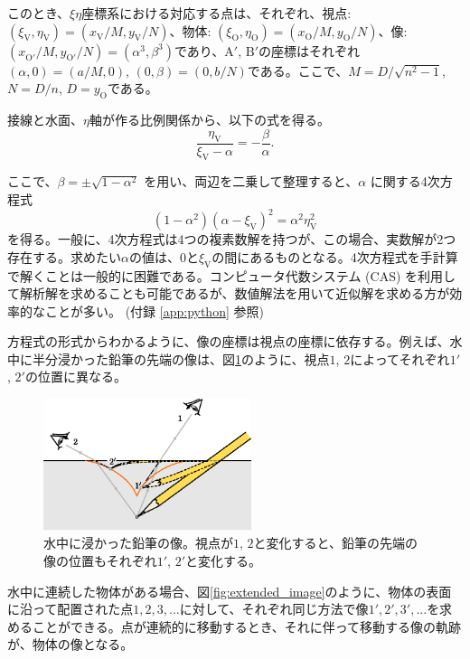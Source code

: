 \documentclass[twocolumn]{article}
\begin{document}
このとき、$\xi\eta$座標系における対応する点は、それぞれ、視点: $(\xi_{\mathrm{V}}^{}, \eta_{\mathrm{V}}^{})=(x_{\mathrm{V}}^{}/M, y_{\mathrm{V}}^{}/N)$、物体: $(\xi_{\mathrm{O}}^{}, \eta_{\mathrm{O}}^{})=(x_{\mathrm{O}}^{}/M, y_{\mathrm{O}}^{}/N)$、像: $(x_{\mathrm{O'}}^{}/M, y_{\mathrm{O'}}^{}/N)=(\alpha^3, \beta^3)$であり、$\mathrm{A'}$, $\mathrm{B'}$の座標はそれぞれ$(\alpha, 0) = (a/M, 0)$, $(0, \beta) = (0, b/N)$である。ここで、$M=D/\sqrt{n^2-1}$, $N=D/n$, $D=y_{\mathrm{O}}^{}$である。

接線と水面、$\eta$軸が作る比例関係から、以下の式を得る。
$$\dfrac{\eta_{\mathrm{V}}^{}}{\xi_{\mathrm{V}}^{}-\alpha}=-\dfrac{\beta}{\alpha}.$$

ここで、$\beta = \pm \sqrt{1-\alpha^2}$ を用い、両辺を二乗して整理すると、$\alpha$ に関する4次方程式
\begin{equation} \label{eqn:tangent}
\left( 1 - \alpha^2 \right) \left(\alpha-\xi_{\mathrm{V}} \right)^2 = \alpha^2 \eta_{\mathrm{V}}^2
\end{equation}
を得る。一般に、4次方程式は4つの複素数解を持つが、この場合、実数解が2つ存在する。求めたい$\alpha$の値は、0と$\xi_{\mathrm{V}}$の間にあるものとなる。4次方程式を手計算で解くことは一般的に困難である。コンピュータ代数システム (CAS) を利用して解析解を求めることも可能であるが、数値解法を用いて近似解を求める方が効率的なことが多い。 (付録 \ref{app:python} 参照)

方程式の形式からわかるように、像の座標は視点の座標に依存する。例えば、水中に半分浸かった鉛筆の先端の像は、図\ref{fig:pencil_view}のように、視点$1$, $2$によってそれぞれ$1'$, $2'$の位置に異なる。
	
\begin{figure}[h]
	\centering
	\includegraphics[width=2.4in]{figs/g43.eps}
	\caption{水中に浸かった鉛筆の像。視点が$1$, $2$と変化すると、鉛筆の先端の像の位置もそれぞれ$1'$, $2'$と変化する。}
	\label{fig:pencil_view}
\end{figure}

水中に連続した物体がある場合、図\ref{fig:extended_image}のように、物体の表面に沿って配置された点$1, 2, 3, ...$に対して、それぞれ同じ方法で像$1', 2', 3', ...$を求めることができる。点が連続的に移動するとき、それに伴って移動する像の軌跡が、物体の像となる。
\end{document}
